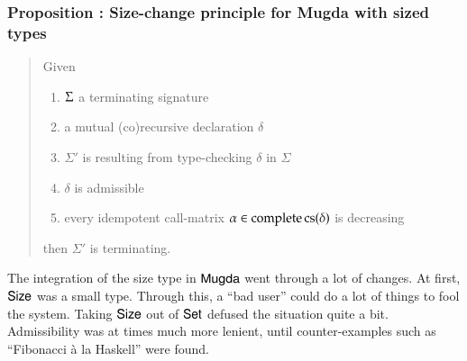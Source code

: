 \subsubsection{Proposition : Size-change principle for Mugda with sized types}
\begin{quote}
Given
\begin{enumerate}
\item
$\Sigma$ a terminating signature
\item
a mutual (co)recursive declaration $\delta$
\item
$\Sigma'$ is resulting from type-checking $\delta$ in $\Sigma$
\item
$\delta$ is admissible
\item
every idempotent call-matrix $ \alpha \in \operatorname{complete} \operatorname{cs}(\delta)$ is decreasing
\end{enumerate}
then $\Sigma'$ is terminating.
\end{quote}
\noindent The integration of the size type in $\textsf{Mugda}$ went through a lot of changes.
At first, $\mathsf{Size}$ was a small type. Through this, a ``bad user'' could do a lot of things
to fool the system. Taking $\mathsf{Size}$ out of $\mathsf{Set}$ defused the situation quite a bit.
Admissibility was at times much more lenient, until counter-examples such as ``Fibonacci \`a la Haskell'' were found.


